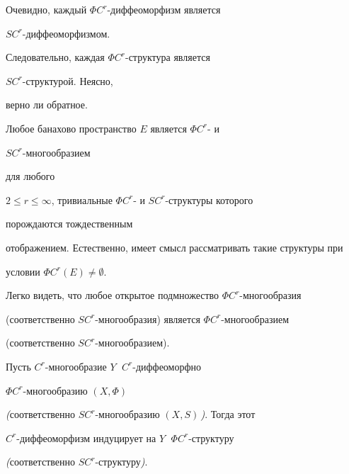 Очевидно, каждый $\Phi C^r$-диффеоморфизм является


$SC^r$-диффеоморфизмом.


Следовательно, каждая $\Phi C^r$-структура является


$SC^r$-структурой. Неясно,


верно ли обратное.





Любое банахово пространство $E$ является $\Phi C^r$- и


$SC^r$-многообразием


для любого


$2\le r\le\infty$, тривиальные $\Phi C^r$- и $SC^r$-структуры которого


порождаются тождественным


отображением. Естественно, имеет смысл рассматривать такие структуры при


условии $\Phi C^r(E)\ne\emptyset$.





Легко видеть, что любое открытое подмножество $\Phi C^r$-многообразия


(соответственно $SC^r$-многообразия) является $\Phi C^r$-многообразием


(соответственно $SC^r$-многообразием).





\begin{thms}


Пусть $C^r$-многообразие $Y\;$ $C^r$-диффеоморфно


$\Phi C^r$-многообразию $(X,\Phi)$


{\em (}соответственно $SC^r$-многообразию $(X,S)\,${\em )}. Тогда этот


$C^r$-диффеоморфизм индуцирует на $Y\;$ $\Phi C^r$-структуру


{\em (}соответственно $SC^r$-структуру{\em )}.


\end{thms}





